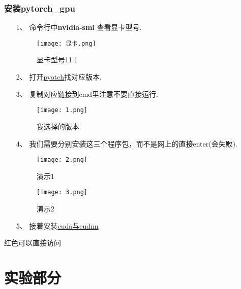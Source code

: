 \subsubsection{安装pytorch\_gpu}
	\begin{enumerate}
	\item [1、]  命令行中\textbf{nvidia-smi} 查看显卡型号.\par
	\begin{figure}[!h]
		\centering
		\texttt{[image: 显卡.png]}
		\caption{显卡型号11.1}
		\label{fig:circuitm1}
	\end{figure} \par
	
	\item [2、] 打开\href{https://pytorch.org/get-started/previous-versions/}{pyotch}找对应版本.
	\item[3、]  复制对应链接到cmd里注意不要直接运行. 
	\begin{figure}[!h]
		\centering
		\texttt{[image: 1.png]}
		\caption{我选择的版本}
		\label{fig:circuitm1}
	\end{figure} \par
	\item[4、 ]   我们需要分别安装这三个程序包，而不是网上的直接enter(会失败).
	\begin{figure}[!h]
		\centering
		\texttt{[image: 2.png]}
		\caption{演示1}
		\label{fig:circuitm1}
	\end{figure} \par 
	\begin{figure}[!h]
	\centering
	\texttt{[image: 3.png]}
	\caption{演示2}
	\label{fig:circuitm1}
\end{figure} \par
	\item[5、]  接着安装\href{https://blog.csdn.net/sinat_23619409/article/details/84202651}{cuda与cudnn}	
\end{enumerate}
\begin{note}
	红色可以直接访问
\end{note}
\section{实验部分}
